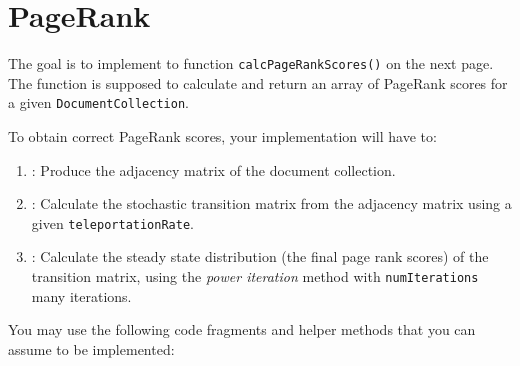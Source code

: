 \documentclass[exam, sectionseven]{acAssignment}
\begin{document}
\section{PageRank}

The goal is to implement to function \texttt{calcPageRankScores()} on the next page.
The function is supposed to calculate and return an array of PageRank scores for a given \texttt{DocumentCollection}.

To obtain correct PageRank scores, your implementation will have to:
\begin{enumerate}
    \item {}: Produce the adjacency matrix of the document collection.
    \item {}: Calculate the stochastic transition matrix from the adjacency matrix using a given \texttt{teleportationRate}.
    \item {}: Calculate the steady state distribution (the final page rank scores) of the transition matrix, using the \emph{power iteration} method with \texttt{numIterations} many iterations.
\end{enumerate}

You may use the following code fragments and helper methods that you can assume to be implemented:
\end{document}
